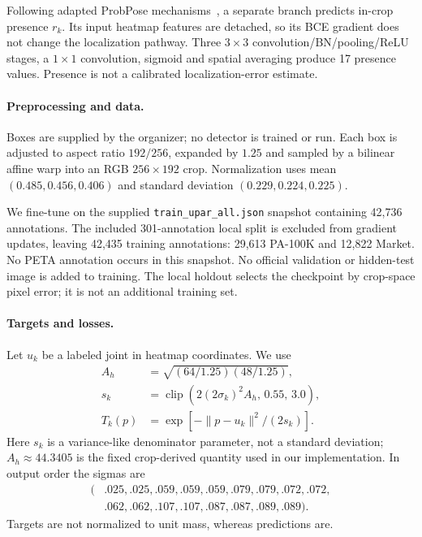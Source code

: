 \documentclass[a4paper,10pt,conference]{ieeeconf}
\begin{document}
Following adapted ProbPose mechanisms~\cite{purkrabek2025probpose}, a separate branch predicts in-crop presence $r_k$. Its input heatmap features are detached, so its BCE gradient does not change the localization pathway. Three $3\!\times\!3$ convolution/BN/pooling/ReLU stages, a $1\!\times\!1$ convolution, sigmoid and spatial averaging produce 17 presence values. Presence is not a calibrated localization-error estimate.

\paragraph{Preprocessing and data.}
Boxes are supplied by the organizer; no detector is trained or run. Each box is adjusted to aspect ratio $192/256$, expanded by $1.25$ and sampled by a bilinear affine warp into an RGB $256\!\times\!192$ crop. Normalization uses mean $(0.485,0.456,0.406)$ and standard deviation $(0.229,0.224,0.225)$.

We fine-tune on the supplied \texttt{train\_upar\_all.json} snapshot containing 42,736 annotations. The included 301-annotation local split is excluded from gradient updates, leaving 42,435 training annotations: 29,613 PA-100K and 12,822 Market. No PETA annotation occurs in this snapshot. No official validation or hidden-test image is added to training. The local holdout selects the checkpoint by crop-space pixel error; it is not an additional training set.

\paragraph{Targets and losses.}
Let $u_k$ be a labeled joint in heatmap coordinates. We use
\begin{align}
 A_h &= \sqrt{(64/1.25)(48/1.25)},\nonumber\\
 s_k &= \operatorname{clip}\!\left(2(2\sigma_k)^2 A_h,\,0.55,\,3.0\right),\\
 T_k(p) &= \exp\!\left[-\|p-u_k\|^2/(2s_k)\right].
\end{align}
Here $s_k$ is a variance-like denominator parameter, not a standard deviation; $A_h\approx44.3405$ is the fixed crop-derived quantity used in our implementation. In output order the sigmas are
\begin{equation*}
\begin{split}
( & .025,.025,.059,.059,.059,.079,.079,.072,.072,\\
 & .062,.062,.107,.107,.087,.087,.089,.089).
\end{split}
\end{equation*}
Targets are not normalized to unit mass, whereas predictions are.
\end{document}
